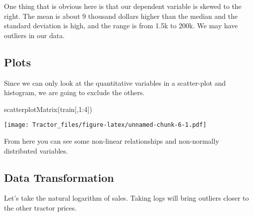 \documentclass[
]{article}
\newenvironment{Shaded}{\begin{snugshade}}{\end{snugshade}}
\newcommand{\AttributeTok}[1]{\textcolor[rgb]{0.77,0.63,0.00}{#1}}
\newcommand{\CommentTok}[1]{\textcolor[rgb]{0.56,0.35,0.01}{\textit{#1}}}
\newcommand{\DecValTok}[1]{\textcolor[rgb]{0.00,0.00,0.81}{#1}}
\newcommand{\FunctionTok}[1]{\textcolor[rgb]{0.00,0.00,0.00}{#1}}
\newcommand{\NormalTok}[1]{#1}
\newcommand{\OtherTok}[1]{\textcolor[rgb]{0.56,0.35,0.01}{#1}}
\newcommand{\SpecialCharTok}[1]{\textcolor[rgb]{0.00,0.00,0.00}{#1}}
\begin{document}
One thing that is obvious here is that our dependent variable is skewed
to the right. The mean is about 9 thousand dollars higher than the
median and the standard deviation is high, and the range is from 1.5k to
200k. We may have outliers in our data.

\hypertarget{plots}{%
\subsection{Plots}\label{plots}}

Since we can only look at the quantitative variables in a scatter-plot
and histogram, we are going to exclude the others.

\begin{Shaded}
\begin{Highlighting}[]
\FunctionTok{scatterplotMatrix}\NormalTok{(train[,}\DecValTok{1}\SpecialCharTok{:}\DecValTok{4}\NormalTok{])}
\end{Highlighting}
\end{Shaded}

\texttt{[image: Tractor\_files/figure-latex/unnamed-chunk-6-1.pdf]}

From here you can see some non-linear relationships and non-normally
distributed variables.

\hypertarget{data-transformation}{%
\subsection{Data Transformation}\label{data-transformation}}

Let's take the natural logarithm of sales. Taking logs will bring
outliers closer to the other tractor prices.

\begin{Shaded}
\end{Shaded}
\end{document}
